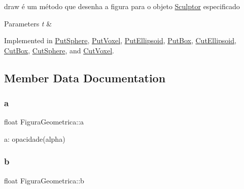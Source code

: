 draw é um método que desenha a figura para o objeto \hyperlink{class_sculptor}{Sculptor} especificado 


\begin{DoxyParams}{Parameters}
{\em t} & \\
\hline
\end{DoxyParams}


Implemented in \hyperlink{class_put_sphere_a5105d1e171563e16c148d8f715321b24}{Put\+Sphere}, \hyperlink{class_put_voxel_af784ab77d8a7aac2010e608796710ccb}{Put\+Voxel}, \hyperlink{class_put_ellipsoid_a961faff306dad93a4b68a35ad9c3027b}{Put\+Ellipsoid}, \hyperlink{class_put_box_a3caaf01d035f5a0749fd308e9a86de94}{Put\+Box}, \hyperlink{class_cut_ellipsoid_a7110c3cd9dc76bd09ec259b429a3e532}{Cut\+Ellipsoid}, \hyperlink{class_cut_box_a01216b04bf5a2d01ce1fb89f3fa62a46}{Cut\+Box}, \hyperlink{class_cut_sphere_ad62239c047f0817ba6fd4b85ae2eae42}{Cut\+Sphere}, and \hyperlink{class_cut_voxel_a4619616e021723dccaf5c7cf12164e01}{Cut\+Voxel}.



\subsection{Member Data Documentation}
\mbox{\label{class_figura_geometrica_ae7c8a027fcec3c357265b90458a4d165}} 
\subsubsection{\texorpdfstring{a}{a}}
{\footnotesize\ttfamily float Figura\+Geometrica\+::a\hspace{0.3cm}{\ttfamily [protected]}}



a\+: opacidade(alpha) 

\mbox{\label{class_figura_geometrica_a25e5d6c21410103c25ec55c0117dac0d}} 
\subsubsection{\texorpdfstring{b}{b}}
{\footnotesize\ttfamily float Figura\+Geometrica\+::b\hspace{0.3cm}{\ttfamily [protected]}}



